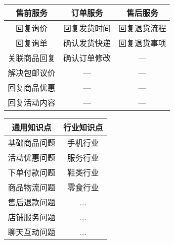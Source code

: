 \begin{table*}[h]

\parbox[t]{0.5\textwidth}{
\centering
\caption{\label{table:alime-ability} “ALIME-千牛店小蜜”产品能力}

\begin{tabular}{ccc}
\toprule
售前服务  &   订单服务  &   售后服务\\
\midrule
回复询价    &   回复发货时间  &   回复退货流程\\
回复询单    &   确认发货快递  &   回复退货事项\\
关联商品回复  &   确认订单修改  &   —\\
解决包邮议价  &   —  &   —\\
回复商品优惠  &   —  &   —\\
回复活动内容  &   —  &   —\\
\bottomrule
\end{tabular}
}
\parbox[t]{0.5\textwidth}{
\centering
\caption{\label{table:alime-kd} “ALIME-千牛店小蜜”电商知识库}

\begin{tabular}{cc}
\toprule
通用知识点 &   行业知识点\\
\midrule
基础商品问题    &   手机行业\\
活动优惠问题    &   服务行业\\
下单付款问题    &   鞋类行业\\
商品物流问题    &   零食行业\\
售后退款问题    &   ...\\
店铺服务问题    &   ...\\
聊天互动问题    &   ...\\
\bottomrule
\end{tabular}
}

\end{table*}